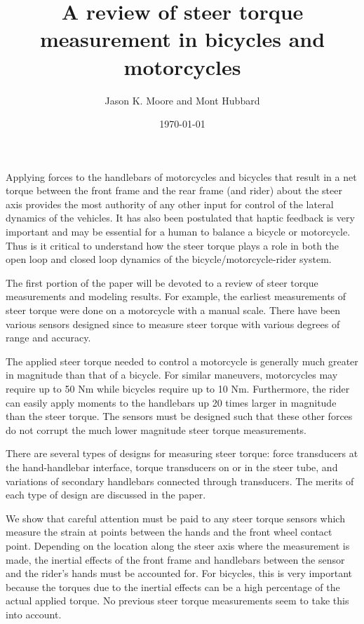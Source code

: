 \documentclass{article}
\title{A review of steer torque measurement in bicycles and motorcycles}
\author{Jason K. Moore and Mont Hubbard}
\date{\today}
\begin{document}
\maketitle

Applying forces to the handlebars of motorcycles and bicycles that result in a
net torque between the front frame and the rear frame (and rider) about the
steer axis provides the most authority of any other input for control of the
lateral dynamics of the vehicles. It has also been postulated that haptic
feedback is very important and may be essential for a human to balance a
bicycle or motorcycle.  Thus is it critical to understand how the steer torque
plays a role in both the open loop and closed loop dynamics of the
bicycle/motorcycle-rider system.

The first portion of the paper will be devoted to a review of steer torque
measurements and modeling results. For example, the earliest measurements of
steer torque were done on a motorcycle \cite{Wilson-Jones1951} with a manual
scale. There have been various sensors designed since to measure steer torque
with various degrees of range and accuracy.

The applied steer torque needed to control a motorcycle is generally much
greater in magnitude than that of a bicycle. For similar maneuvers, motorcycles
may require up to 50 Nm while bicycles require up to 10 Nm. Furthermore, the
rider can easily apply moments to the handlebars up 20 times larger in
magnitude than the steer torque. The sensors must be designed such that these
other forces do not corrupt the much lower magnitude steer torque measurements.

There are several types of designs for measuring steer torque: force
transducers at the hand-handlebar interface, torque transducers on or in the
steer tube, and variations of secondary handlebars connected through
transducers. The merits of each type of design are discussed in the paper.

We show that careful attention must be paid to any steer torque sensors which
measure the strain at points between the hands and the front wheel contact
point.  Depending on the location along the steer axis where the measurement is
made, the inertial effects of the front frame and handlebars between the sensor
and the rider's hands must be accounted for. For bicycles, this is very
important because the torques due to the inertial effects can be a high
percentage of the actual applied torque. No previous steer torque measurements
seem to take this into account.
\end{document}
